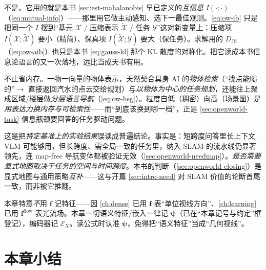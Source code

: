 \begin{pitfall}
不是。它用的就是本书 \cref{sec:est-mahalanobis} 早已定义的\emph{互信息} $I(\cdot;\cdot)$（\cref{eq:mutual-info}）——那里用它做主动感知、选下一最佳观测。\cref{eq:ow-ib} 只是把同一个 $I$ 摆到“基元 $\mathcal{X}$ / 压缩表示 $\tilde{\mathcal{X}}$ / 任务 $\mathcal{Y}$”这对新变量上：压缩项 $I(\mathcal{X};\tilde{\mathcal{X}})$ 要小（精简）、保真项 $I(\tilde{\mathcal{X}};\mathcal{Y})$ 要大（保任务）。求解用的 $D_{\mathrm{JS}}$（\cref{eq:ow-aib}）也只是本书 \cref{eq:gauss-kl} 那个 KL 散度的对称化。把它读成本书信息论语言的又一次落地，远比当成天书有用。
\end{pitfall}

\begin{pitfall}
不止省内存。一物一向量的物体表示，天然契合具身 AI 的\emph{物体检索}（“找点能喝的”$\to$ 直接返回汽水的点云交给规划）与\emph{以物体为中心的任务规划}，还能往上聚成区域/楼层做\emph{分层语言导航}（\cref{eq:ow-hsg}）。粒度自低（稠密）向高（场景图）是\emph{用表达力换内存与可检索性}——而“到底该换到哪一档”，正是 \cref{sec:openworld-task} 信息瓶颈要回答的任务驱动问题。
\end{pitfall}

\begin{pitfall}
这是把\emph{特定基准上的实验结果}误读成普遍结论。事实是：短跨度问答里长上下文 VLM 可能够用，但长跨度、需全局一致的任务里，纳入 SLAM 的流水线仍显著领先，连 map-free 导航变体都被验证无效（\cref{sec:openworld-needmap}）。\emph{是否需要显式地图取决于任务的空间与时间跨度}。本书的判断（\cref{sec:openworld-closing}）是显式地图与通用策略\emph{互补}——这与开篇 \cref{sec:intro-need} 对 SLAM 价值的论断首尾一致，而非被它推翻。
\end{pitfall}

\begin{pitfall}
本章特意\emph{不}用 $\mathbf{f}$ 记特征——因 \cref{ch:dense} 已用 $\mathbf{f}$ 表“单位视线方向”、\cref{ch:learning} 已用 $\mathbf{f}^{\mathrm{flow}}$ 表光流场。本章一切语义特征/嵌入一律记 $\boldsymbol\psi$（已在“本章记号与约定”框登记），编码器记 $\mathcal{E}_X$。读公式时认准 $\boldsymbol\psi$，免得把“语义特征”当成“几何视线”。
\end{pitfall}

\section*{本章小结}

